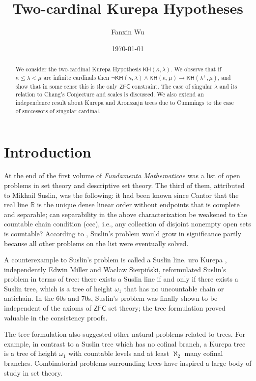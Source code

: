 \documentclass[10pt,reqno]{amsart}
\title{Two-cardinal Kurepa Hypotheses}
\author{Fanxin Wu}
\date{\today}
\theoremstyle{plain}
\theoremstyle{definition}
\theoremstyle{remark}
\begin{document}
\begin{abstract}
We consider the two-cardinal Kurepa Hypothesis $\mathsf{KH}(\kappa,\lambda)$. We observe that if $\kappa\leq\lambda<\mu$ are infinite cardinals then $\lnot\mathsf{KH}(\kappa,\lambda)\land\mathsf{KH}(\kappa,\mu)\rightarrow\mathsf{KH}(\lambda^+,\mu)$, and show that in some sense this is the only $\mathsf{ZFC}$ constraint. The case of singular $\lambda$ and its relation to Chang's Conjecture and scales is discussed. We also extend an independence result about Kurepa and Aronszajn trees due to Cummings to the case of successors of singular cardinal.
\end{abstract}


\maketitle



\section{Introduction}

At the end of the first volume of \textit{Fundamenta Mathematicae} \cite{suslin1920} was a list of open problems in set theory and descriptive set theory. The third of them, attributed to Mikhail Suslin, was the following: it had been known since Cantor that the real line $\mathbb{R}$ is the unique dense linear order without endpoints that is complete and separable; can separability in the above characterization be weakened to the countable chain condition (ccc), i.e., any collection of disjoint nonempty open sets is countable? According to \cite{Kanamori_2011}, Suslin's problem would grow in significance partly because all other problems on the list were eventually solved.

A counterexample to Suslin's problem is called a Suslin line. \DJ uro Kurepa \cite{kurepa1936}, independently Edwin Miller and Wac\l aw Sierpi\'{n}ski, reformulated Suslin's problem in terms of tree: there exists a Suslin line if and only if there exists a Suslin tree, which is a tree of height $\omega_1$ that has no uncountable chain or antichain. In the 60s and 70s, Suslin's problem was finally shown to be independent of the axioms of $\mathsf{ZFC}$ set theory; the tree formulation proved valuable in the consistency proofs.

The tree formulation also suggested other natural problems related to trees. For example, in contrast to a Suslin tree which has no cofinal branch, a Kurepa tree is a tree of height $\omega_1$ with countable levels and at least $\aleph_2$ many cofinal branches. Combinatorial problems surrounding trees have inspired a large body of study in set theory.
\end{document}
